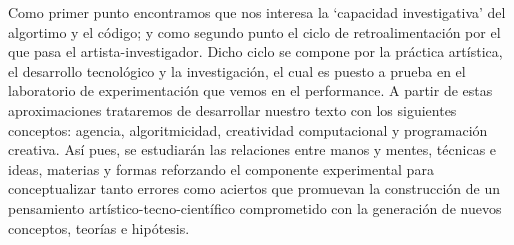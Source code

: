 Como primer punto encontramos que nos interesa la ‘capacidad investigativa’ del algortimo y el código; y como segundo punto el ciclo de retroalimentación por el que pasa el artista-investigador. Dicho ciclo se compone por la práctica artística, el desarrollo tecnológico y la investigación, el cual es puesto a prueba en el laboratorio de experimentación que vemos en el performance. A partir de estas aproximaciones trataremos de desarrollar nuestro texto con los siguientes conceptos: agencia, algoritmicidad, creatividad computacional y programación creativa. Así pues, se estudiarán las relaciones entre manos y mentes, técnicas e ideas, materias y formas reforzando el componente experimental para conceptualizar tanto errores como aciertos que promuevan la construcción de un pensamiento artístico-tecno-científico comprometido con la generación de nuevos conceptos, teorías e hipótesis.

